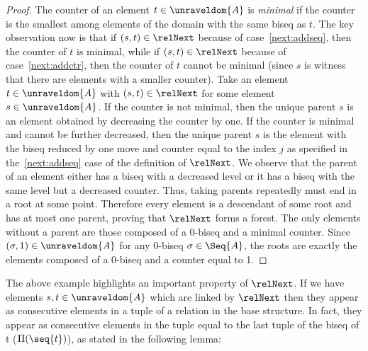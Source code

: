 \begin{proof}
  The counter of an element $t \in \unraveldom{A}$ is \emph{minimal} if the counter is the smallest among elements of the domain with the same biseq as $t$.
  The key observation now is that if $(s,t) \in \relNext$ because of case~\ref{next:addseq}, then the counter of $t$ is minimal, while if $(s,t) \in \relNext$ because of case~\ref{next:addctr}, then the counter of $t$ cannot be minimal (since $s$ is witness that there are elements with a smaller counter).
  Take an element $t \in \unraveldom{A}$ with $(s, t) \in \relNext$ for some element $s \in \unraveldom{A}$.
  If the counter is not minimal, then the unique parent $s$ is an element obtained by decreasing the counter by one.
  If the counter is minimal and cannot be further decreased, then the unique parent $s$ is the element with the biseq reduced by one move and counter equal to the index $j$ as specified in the~\ref{next:addseq} case of the definition of $\relNext$.
  We observe that the parent of an element either has a biseq with a decreased level or it has a biseq with the same level but a decreased counter.
  Thus, taking parents repeatedly must end in a root at some point.
  Therefore every element is a descendant of some root and has at most one parent, proving that $\relNext$ forms a forest.
  The only elements without a parent are those composed of a 0-biseq and a minimal counter.
  Since $(\sigma, 1) \in \unraveldom{A}$ for any 0-biseq $\sigma \in \Seq{A}$, the roots are exactly the elements composed of a 0-biseq and a counter equal to 1.
\end{proof}

\noindent
The above example highlights an important property of $\relNext$.
If we have elements $s,t \in \unraveldom{A}$ which are linked by $\relNext$ then they appear as consecutive elements in a tuple of a relation in the base structure.
In fact, they appear as consecutive elements in the tuple equal to the last tuple of the biseq of t (\ie $\Pi(\seq{t})$), as stated in the following lemma:


